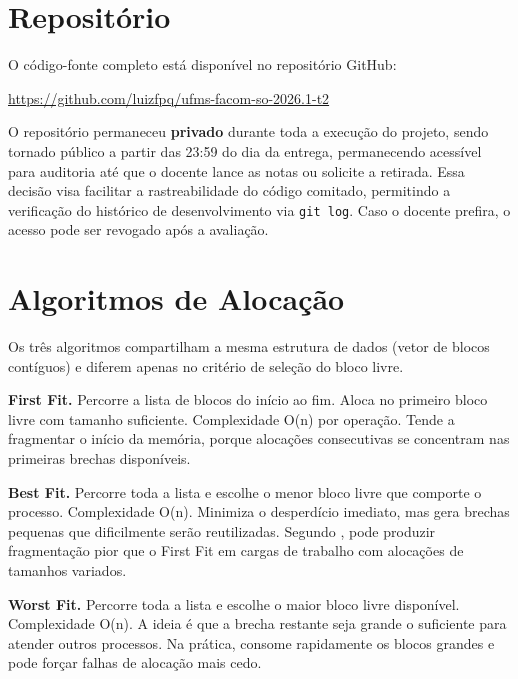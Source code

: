 \documentclass[12pt]{article}
\begin{document}
\section{Repositório}

O código-fonte completo está disponível no repositório GitHub:

\begin{center}
\url{https://github.com/luizfpq/ufms-facom-so-2026.1-t2}
\end{center}

O repositório permaneceu \textbf{privado} durante toda a execução do projeto, sendo tornado público a partir das 23:59 do dia da entrega, permanecendo acessível para auditoria até que o docente lance as notas ou solicite a retirada. Essa decisão visa facilitar a rastreabilidade do código comitado, permitindo a verificação do histórico de desenvolvimento via \texttt{git log}. Caso o docente prefira, o acesso pode ser revogado após a avaliação.

\section{Algoritmos de Alocação}

Os três algoritmos compartilham a mesma estrutura de dados (vetor de blocos contíguos) e diferem apenas no critério de seleção do bloco livre.

\textbf{First Fit.} Percorre a lista de blocos do início ao fim. Aloca no primeiro bloco livre com tamanho suficiente. Complexidade O(n) por operação. Tende a fragmentar o início da memória, porque alocações consecutivas se concentram nas primeiras brechas disponíveis.

\textbf{Best Fit.} Percorre toda a lista e escolhe o menor bloco livre que comporte o processo. Complexidade O(n). Minimiza o desperdício imediato, mas gera brechas pequenas que dificilmente serão reutilizadas. Segundo \cite{silberschatz2018}, pode produzir fragmentação pior que o First Fit em cargas de trabalho com alocações de tamanhos variados.

\textbf{Worst Fit.} Percorre toda a lista e escolhe o maior bloco livre disponível. Complexidade O(n). A ideia é que a brecha restante seja grande o suficiente para atender outros processos. Na prática, consome rapidamente os blocos grandes e pode forçar falhas de alocação mais cedo.
\end{document}
